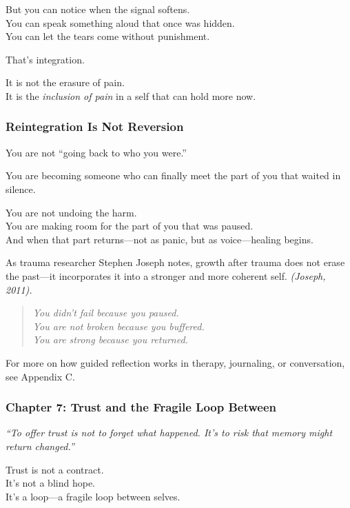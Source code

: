 But you can notice when the signal softens.\\
You can speak something aloud that once was hidden.\\
You can let the tears come without punishment.

That's integration.

It is not the erasure of pain.\\
It is the \emph{inclusion of pain} in a self that can hold more now.

\subsubsection{\texorpdfstring{\textbf{Reintegration Is Not
Reversion}}{Reintegration Is Not Reversion}}\label{reintegration-is-not-reversion}

You are not ``going back to who you were.''

You are becoming someone who can finally meet the part of you that
waited in silence.

You are not undoing the harm.\\
You are making room for the part of you that was paused.\\
And when that part returns---not as panic, but as voice---healing
begins.

As trauma researcher Stephen Joseph notes, growth after trauma does not
erase the past---it incorporates it into a stronger and more coherent
self. \emph{(Joseph, 2011).}

\begin{quote}
\emph{You didn't fail because you paused.\\
You are not broken because you buffered.\\
You are strong because you returned.}
\end{quote}

For more on how guided reflection works in therapy, journaling, or
conversation, see Appendix C.

\subsubsection{\texorpdfstring{\textbf{Chapter 7: Trust and the Fragile
Loop
Between}}{Chapter 7: Trust and the Fragile Loop Between}}\label{chapter-7-trust-and-the-fragile-loop-between}

\emph{``To offer trust is not to forget what happened. It's to risk that
memory might return changed.''}

Trust is not a contract.\\
It's not a blind hope.\\
It's a loop---a fragile loop between selves.

